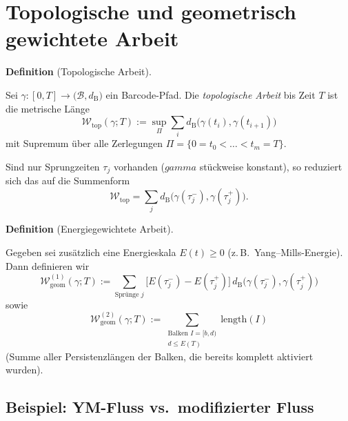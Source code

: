 \documentclass[10pt, letterpaper]{article}
\newcommand{\CustomHeading}[3]{%
  \par\medskip\noindent%
  \textbf{#1 #2} \textnormal{(#3)}.\enskip%
}
\newenvironment{DEF}[2]{\CustomHeading{Definition}{#1}{#2}}{}
\begin{document}
\pagebreak

\section{Topologische und geometrisch gewichtete Arbeit}

\begin{DEF}{}{Topologische Arbeit}
  Sei
  \(
    \gamma:[0,T]\to\bigl(\mathcal{B},d_{\mathrm B}\bigr)
  \)
  ein Barcode-Pfad.  
  Die \emph{topologische Arbeit} bis Zeit $T$ ist die
  metrische Länge
  \[
      \mathcal W_{\mathrm{top}}(\gamma;T)
      :=\sup_{\Pi}
         \sum_{i}
           d_{\mathrm B}
             \bigl(\gamma(t_i),\gamma(t_{i+1})\bigr)
  \]
  mit Supremum über alle Zerlegungen
  \(\Pi=\{0=t_0<\dots<t_m=T\}\).

  Sind nur Sprungzeiten $\tau_j$ vorhanden
  ($gamma$ stückweise konstant),
  so reduziert sich das auf die Summenform
  \[
    \mathcal W_{\mathrm{top}}
      =\sum_j
         d_{\mathrm B}
           \bigl(\gamma(\tau_j^-),\gamma(\tau_j^+)\bigr).
  \]
\end{DEF}

\begin{DEF}{}{Energie\-gewichtete Arbeit}
  Gegeben sei zusätzlich eine Energieskala
  \(E(t)\ge0\) (z.\,B.\ Yang–Mills-Energie).
  Dann definieren wir
  \[
      \mathcal W_{\mathrm{geom}}^{(1)}(\gamma;T)
        :=\sum_{\text{Sprünge }j}
            \bigl[E(\tau_j^-)-E(\tau_j^+)\bigr]\,
            d_{\mathrm B}
              \bigl(\gamma(\tau_j^-),\gamma(\tau_j^+)\bigr)
  \]
  sowie
  \[
      \mathcal W_{\mathrm{geom}}^{(2)}(\gamma;T)
        :=\sum_{\substack{\text{Balken }I=[b,d)\\
                          d\le E(T)}} \text{length}(I)
  \]
  (Summe aller Persistenz­längen der Balken, die bereits komplett
  aktiviert wurden).
\end{DEF}

\subsection{Beispiel: YM-Fluss vs.\ modifizierter Fluss}
\end{document}

